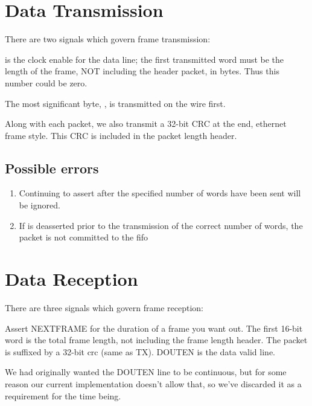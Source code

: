 

\section{Data Transmission}

There are two signals which govern frame transmission: 



 is the clock enable for the data line; the first
transmitted word must be the length of the frame, NOT including the
header packet, in bytes.  Thus this number could be zero.

The most significant byte, , is transmitted on the
wire first.

Along with each packet, we also transmit a 32-bit CRC at the end,
ethernet frame style. This CRC is included in the packet length header. 



\subsection{Possible errors}
\begin{enumerate}
\item Continuing to assert  after the specified
  number of words have been sent will be ignored.
\item If  is deasserted prior to the transmission of the correct number of words, the packet is not committed to the fifo
\end{enumerate}


\section{Data Reception}

There are three signals which govern frame reception: 


Assert NEXTFRAME for the duration of a frame you want out. The first 16-bit word is the total frame length, not including the frame length header. The packet is suffixed by a 32-bit crc (same as TX). DOUTEN is the data valid line. 

We had originally wanted the DOUTEN line to be continuous, but for some reason our current implementation doesn't allow that, so we've discarded it as a requirement for the time being. 
